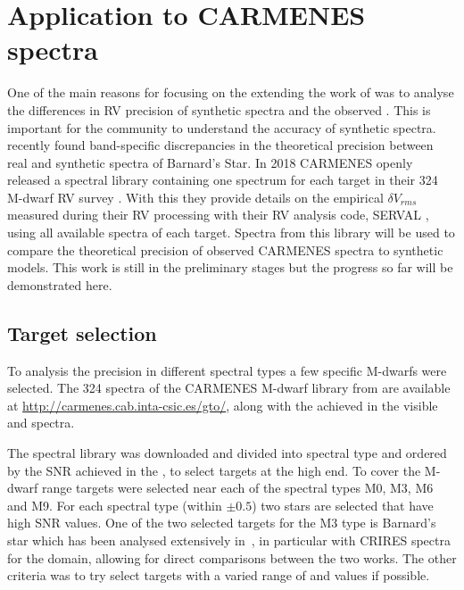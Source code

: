 
\section{Application to {CARMENES} spectra}

One of the main reasons for focusing on the extending the work of\citet{figueira_radial_2016} was to analyse the differences in {RV} precision of synthetic spectra and the observed \nir{}.
This is important for the community to understand the accuracy of synthetic spectra.  \citet{artigau_optical_2018} recently found band-specific discrepancies in the theoretical precision between real and synthetic \nir{} spectra of Barnard's Star.
In 2018 {CARMENES} openly released a spectral library containing one spectrum for each target in their 324 M-dwarf {RV} survey \citet{reiners_carmenes_2018}.
With this they provide details on the empirical \(\delta V_{rms}\) measured during their {RV} processing with their {RV} analysis code, {SERVAL} \citep{zechmeister_spectrum_2018}, using all available spectra of each target.
Spectra from this library will be used to compare the theoretical precision of observed {CARMENES} spectra to synthetic models.
This work is still in the preliminary stages but the progress so far will be demonstrated here.

\subsection{Target selection}
\label{subsec:carmense_targets}
To analysis the precision in different spectral types a few specific M-dwarfs were selected.
The 324 spectra of the {CARMENES} M-dwarf library from \citet{reiners_carmenes_2018} are available at \href{http://carmenes.cab.inta-csic.es/gto/}{http://carmenes.cab.inta-csic.es/gto/}, along with the achieved \snr{} in the visible and \nir{} spectra.

The spectral library was downloaded and divided into spectral type and ordered by the {SNR} achieved in the \nir{}, to select targets at the high \snr{} end.
To cover the M-dwarf range targets were selected near each of the spectral types M0, M3, M6 and M9.
For each spectral type (within $\pm0.5$) two stars are selected that have high {SNR} values.
One of the two selected targets for the M3 type is Barnard's star which has been analysed extensively in~\citet{artigau_optical_2018}, in particular with CRIRES spectra for the \nir{} domain, allowing for direct comparisons between the two works.
The other criteria was to try select targets with a varied range of \Logg and \feh{} values if possible.

